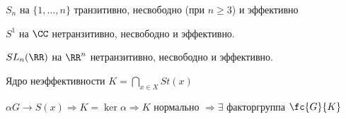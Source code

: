 \begin{example}{}{}
    \( S_n \) на \( \{ 1, \ldots, n \} \) транзитивно, несвободно (при \( n \geq 3 \)) и эффективно
\end{example}

\begin{example}{}{}
    \( S^1 \) на \( \CC \) нетранзитивно, несвободно и эффективно.
\end{example}

\begin{example}{}{}
    \( SL_n(\RR) \) на \( \RR^n \) нетранзитивно, несвободно и эффективно.
\end{example}

\begin{defn}{}{}
    Ядро неэффективности \( K = \bigcap\limits_{x \in X} St(x) \)
\end{defn}

\( \alpha G \to S(x) \Rightarrow K = \ker \alpha \Rightarrow K \) нормально \( \Rightarrow \exists \) факторгруппа \( \fc{G}{K} \)
